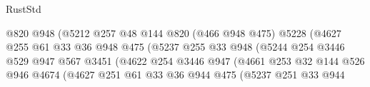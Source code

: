 \begin{lexlean}{RustStd}
\begin{coremodule}
                                        @820
                                        @948
                                        (@5212
                                          @257
                                          @48
                                          @144
                                          @820
                                          (@466 @948 @475)
                                          @5228
                                          (@4627
                                            @255
                                            @61
                                            @33
                                            @36
                                            @948
                                            @475
                                            (@5237
                                              @255
                                              @33
                                              @948
                                              (@5244
                                                @254
                                                @3446
                                                @529
                                                @947
                                                @567
                                                @3451
                                                (@4622
                                                  @254
                                                  @3446
                                                  @947
                                                  (@4661
                                                    @253
                                                    @32
                                                    @144
                                                    @526
                                                    @946
                                                    @4674
                                                    (@4627
                                                      @251
                                                      @61
                                                      @33
                                                      @36
                                                      @944
                                                      @475
                                                      (@5237
                                                        @251
                                                        @33
                                                        @944

\end{coremodule}
\end{lexlean}
